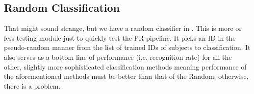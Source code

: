 \subsection{Random Classification}

That might sound strange, but we have a random classifier in {\marf}.
This is more or less testing module just to quickly test
the PR pipeline.  It picks an ID in the pseudo-random manner from the list of
trained IDs of subjects to classification.  It also serves as
a bottom-line of performance (i.e. recognition rate) for all
the other, slightly more sophisticated classification methods meaning
performance of the aforementioned methods must be better than
that of the Random; otherwise, there is a problem.
